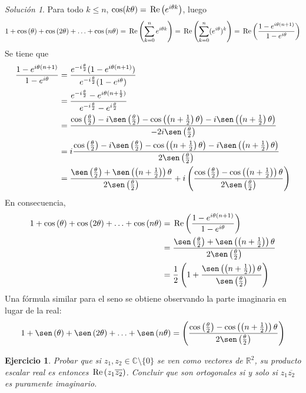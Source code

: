 \documentclass[11pt]{report}
\newcommand{\R}{\mathbb R}
\newcommand{\C}{\mathbb C}
\newcommand{\pars}[1]{\left( #1 \right)} %
\renewcommand{\Re}[1]{\,\textup{Re}\pars{#1}}
\newtheorem{exercise}{Ejercicio}
\theoremstyle{remark}
\newtheorem*{resolution}{Solución}
\begin{document}
\begin{resolution}
    Para todo $k \leq n$, $\cos(k\theta) = \Re{e^{i\theta k}}$, luego
    \[1+\cos\pars{\theta}+\cos\pars{2\theta}+\mathellipsis+\cos\pars{n\theta} = \Re{\sum_{k=0}^n e^{i\theta k}} = \Re{\sum_{k=0}^n(e^{i\theta})^k} = \Re{\frac{1-e^{i\theta(n+1)}}{1-e^{i\theta}}}\]
    Se tiene que
    \[
    \begin{aligned}[t]
        \frac{1-e^{i\theta(n+1)}}{1-e^{i\theta}} &= \frac{e^{-i\frac{\theta}{2}}(1-e^{i\theta(n+1)})}{e^{-i\frac{\theta}{2}}(1-e^{i\theta})} \\
        &= \frac{e^{-i\frac{\theta}{2}}-e^{i\theta(n+\frac{1}{2})}}{e^{-i\frac{\theta}{2}}-e^{i\frac{\theta}{2}}} \\ 
        &= \frac{\cos\pars{\frac{\theta}{2}}-i\sen\pars{\frac{\theta}{2}}-\cos\pars{\pars{n+\frac{1}{2}}\theta}-i\sen\pars{\pars{n+\frac{1}{2}}\theta}}{-2i\sen\pars{\frac{\theta}{2}}} \\
        &= i\frac{\cos\pars{\frac{\theta}{2}}-i\sen\pars{\frac{\theta}{2}}-\cos\pars{\pars{n+\frac{1}{2}}\theta}-i\sen\pars{\pars{n+\frac{1}{2}}\theta}}{2\sen\pars{\frac{\theta}{2}}} \\
        &=\frac{\sen\pars{\frac{\theta}{2}}+\sen\pars{\pars{n+\frac{1}{2}}}\theta}{2\sen\pars{\frac{\theta}{2}}}+i\pars{\frac{\cos\pars{\frac{\theta}{2}}-\cos\pars{\pars{n+\frac{1}{2}}}\theta}{2\sen\pars{\frac{\theta}{2}}}}
    \end{aligned}
    \]
    En consecuencia,
    \[\begin{aligned}[t]
    1+\cos\pars{\theta}+\cos\pars{2\theta}+\mathellipsis+\cos\pars{n\theta} &= \Re{\frac{1-e^{i\theta(n+1)}}{1-e^{i\theta}}} \\
    &= \frac{\sen\pars{\frac{\theta}{2}}+\sen\pars{\pars{n+\frac{1}{2}}}\theta}{2\sen\pars{\frac{\theta}{2}}} \\ 
    &= \frac{1}{2}\pars{1+\frac{\sen\pars{\pars{n+\frac{1}{2}}}\theta}{\sen\pars{\frac{\theta}{2}}}}
    \end{aligned}
    \]
    Una fórmula similar para el seno se obtiene observando la parte imaginaria en lugar de la real:
    \[1+\sen\pars{\theta}+\sen\pars{2\theta}+\mathellipsis+\sen\pars{n\theta} = \pars{\frac{\cos\pars{\frac{\theta}{2}}-\cos\pars{\pars{n+\frac{1}{2}}}\theta}{2\sen\pars{\frac{\theta}{2}}}}\]
    \end{resolution}

\begin{exercise}
    Probar que si $z_1,z_2 \in \C \setminus \{0\}$ se ven como vectores de $\R^2$, su producto escalar real es entonces $\Re{z_1\overline{z_2}}$. Concluir que son ortogonales si y solo si $z_1\overline{z_2}$ es puramente imaginario.
\end{exercise}
\end{document}
